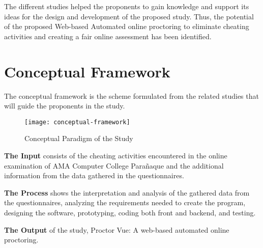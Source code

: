 The different studies helped the proponents to gain knowledge and support its ideas for the design and development of the proposed study.
Thus, the potential of the proposed Web-based Automated online proctoring to eliminate cheating activities and creating a fair online assessment has been identified.

\section{Conceptual Framework}

The conceptual framework is the scheme formulated from the related studies that will guide the proponents in the study.

\pagebreak

\begin{figure}[h!]
   \begin{center}
      \texttt{[image: conceptual-framework]}
      \caption{Conceptual Paradigm of the Study}
   \end{center}
\end{figure}

\textbf{The Input} consists of the cheating activities encountered in the online examination of AMA Computer College Parañaque and the additional information from the data gathered in the questionnaires.

\textbf{The Process} shows the interpretation and analysis of the gathered data from the questionnaires, analyzing the requirements needed to create the program, designing the software, prototyping, coding both front and backend, and testing.

\textbf{The Output} of the study, Proctor Vue: A web-based automated online proctoring.

